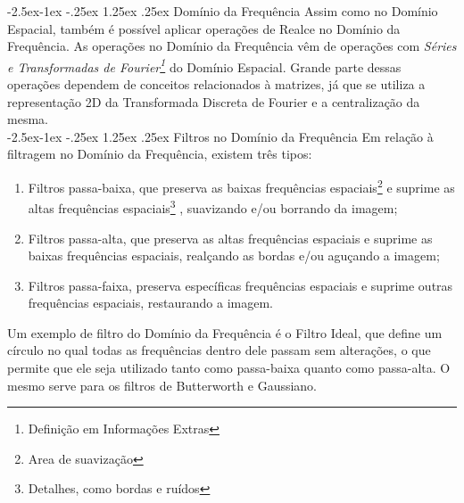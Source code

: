 \documentclass{article}
\makeatletter
\renewcommand\paragraph{\@startsection{paragraph}{4}{\z@}%
            {-2.5ex\@plus -1ex \@minus -.25ex}%
            {1.25ex \@plus .25ex}%
            {\normalfont\normalsize\bfseries}}
\makeatother
\begin{document}
                \paragraph{Domínio da Frequência}
                    Assim como no Domínio Espacial, também é possível aplicar operações de Realce no Domínio da Frequência. As operações no Domínio da Frequência vêm de operações com {\it Séries e Transformadas de Fourier\footnote{Definição em Informações Extras}} do Domínio Espacial. Grande parte dessas operações dependem de conceitos relacionados à matrizes, já que se utiliza a representação 2D da Transformada Discreta de Fourier e a centralização da mesma.\\
                    
                \paragraph{Filtros no Domínio da Frequência}
                    Em relação à filtragem no Domínio da Frequência, existem três tipos:
                    
                    \begin{enumerate}
                    
                    \item Filtros passa-baixa, que preserva as baixas frequências espaciais\footnote{Area de suavização} e suprime as altas frequências espaciais\footnote{Detalhes, como bordas e ruídos} , suavizando e/ou borrando da imagem;
                    
                    \item Filtros passa-alta, que preserva as altas frequências espaciais e suprime as baixas frequências espaciais, realçando as bordas e/ou aguçando a imagem;
                    
                    \item Filtros passa-faixa, preserva específicas frequências espaciais e suprime outras frequências espaciais, restaurando a imagem.
                
                    \end{enumerate}
                Um exemplo de filtro do Domínio da Frequência é o Filtro Ideal, que define um círculo no qual todas as frequências dentro dele passam sem alterações, o que permite que ele seja utilizado tanto como passa-baixa quanto como passa-alta. O mesmo serve para os filtros de Butterworth e Gaussiano. 
                     
\end{document}
